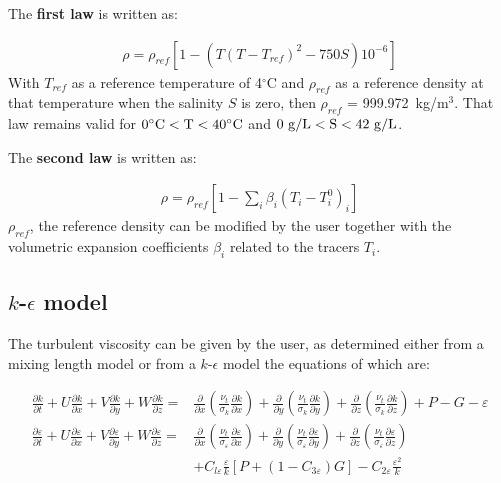 The \textbf{first law} is written as:

\begin{align}
\rho =\rho _{ref} \left[1-\left(T\left(T-T_{ref} \right)^{2} -750S\right)10^{-6} \right]
\end{align}
With $T_{ref} $ as a reference temperature of 4${}^\circ$C and $\rho _{ref} $
as a reference density at that temperature when the salinity $S$ is
zero, then $\rho _{ref} $ = 999.972~kg/m${}^{3}$. That law remains valid for
$0^{\circ} \rm{C} < T < 40^{\circ} \rm{C}$ and $0~\rm{g/L} < S < 42~\rm{g/L}$.

The \textbf{second law} is written as:

\begin{align}
\rho =\rho _{ref} \left[1-\sum _{i}\beta _{i} \left(T_{i} -T_{i}^{0} \right)_{i}  \right]
\end{align}
$\rho _{ref}$,
the reference density can be modified by the user together with the volumetric
expansion coefficients $\beta _{i}$ related to the tracers $T_{i}$.

\subsection{$k$-$\epsilon$ model}

The turbulent viscosity can be given by the user, as determined either from a
mixing length model or from a $k$-$\epsilon$ model the equations of which are:

\begin{subequations}
\begin{align}
\frac{\partial k}{\partial t}
 + U\frac{\partial k}{\partial x} + V\frac{\partial k}{\partial y}
 + W\frac{\partial k}{\partial z} =&
\frac{\partial }{\partial x}
\left(\frac{\nu _{t} }{\sigma _{k} } \frac{\partial k}{\partial x} \right)
 + \frac{\partial }{\partial y}
\left(\frac{\nu _{t} }{\sigma _{k} } \frac{\partial k}{\partial y} \right)
 + \frac{\partial }{\partial z}
\left(\frac{\nu _{t} }{\sigma _{k} } \frac{\partial k}{\partial z} \right)
 + P -G - \varepsilon
\\
\frac{\partial \varepsilon }{\partial t}
 + U\frac{\partial \varepsilon}{\partial x}
 + V\frac{\partial \varepsilon}{\partial y}
 + W\frac{\partial \varepsilon }{\partial z}
 =& \frac{\partial }{\partial x}
\left(\frac{\nu _{t} }{\sigma _{\varepsilon } } \frac{\partial \varepsilon }{\partial x} \right )
+ \frac{\partial }{\partial y}
\left(\frac{\nu _{t} }{\sigma _{\varepsilon } } \frac{\partial \varepsilon }{\partial y} \right)
 + \frac{\partial }{\partial z}
\left(\frac{\nu _{t} }{\sigma _{\varepsilon } } \frac{\partial \varepsilon }{\partial z} \right)
\\
 &+ C_{l\varepsilon } \frac{\varepsilon }{k}
\left[P+\left(1-C_{3\varepsilon } \right)G\right]
- C_{2\varepsilon } \frac{\varepsilon^{2} }{k}
\end{align}
\end{subequations}

